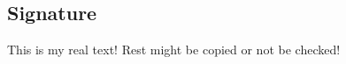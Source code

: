 \subsection{Signature}\label{subsection:counter-tampering-signature}

This is my real text! Rest might be copied or not be checked!
